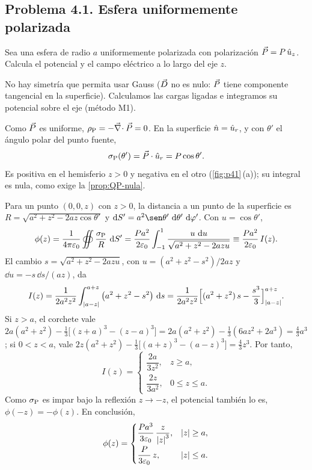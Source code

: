 \subsection{Problema 4.1. Esfera uniformemente polarizada}\label{sec:p41}

\begin{problema}\label{prob:esfera-polarizada}
Sea una esfera de radio $a$ uniformemente polarizada con polarización $\vec P=P\,\hat u_{z}$. Calcula el potencial y el campo eléctrico a lo
largo del eje $z$.
\end{problema}

\begin{resolucion}
\idea No hay simetría que permita usar Gauss ($\vec D$ no es nulo: $\vec P$ tiene componente tangencial en la superficie). Calculamos
las cargas ligadas e integramos su potencial sobre el eje (método M1).

 Como $\vec P$ es uniforme, $\rho_{\mathrm P}=-\vec\nabla\!\cdot\vec P=0$. En la superficie $\hat n=\hat u_{r}$, y con $\theta'$ el ángulo polar del
punto fuente,
\[
  \sigma_{\mathrm P}(\theta')=\vec P\cdot\hat u_{r}=P\cos\theta' .
\]
Es positiva en el hemisferio $z>0$ y negativa en el otro (\cref{fig:p41}\,(a)); su integral es nula, como exige la \cref{prop:QP-nula}.

 Para un punto $(0,0,z)$ con $z>0$, la distancia a un punto de la superficie es
$R=\sqrt{a^2+z^2-2az\cos\theta'}$ y $\dd S'=a^2\sen\theta'\,\dd\theta'\,\dd\varphi'$. Con $u=\cos\theta'$,
\[
  \phi(z)=\frac{1}{4\pi\varepsilon_0}\oiint\frac{\sigma_{\mathrm P}}{R}\,\mathop{}\!\mathrm{d} S'=\frac{Pa^2}{2\varepsilon_0}\int_{-1}^{1}\frac{u\,\mathop{}\!\mathrm{d} u}{\sqrt{a^2+z^2-2azu}}\equiv\frac{Pa^2}{2\varepsilon_0}\,I(z).
\]
El cambio $s=\sqrt{a^2+z^2-2azu}$, con $u=(a^2+z^2-s^2)/2az$ y $\dd u=-s\,\dd s/(az)$, da
\[
  I(z)=\frac{1}{2a^2z^2}\int_{\left\lvert a-z\right\rvert}^{a+z}\big(a^2+z^2-s^2\big)\,\mathop{}\!\mathrm{d} s
      =\frac{1}{2a^2z^2}\Big[(a^2+z^2)\,s-\frac{s^3}{3}\Big]_{\left\lvert a-z\right\rvert}^{a+z}.
\]
Si $z>a$, el corchete vale $2a(a^2+z^2)-\frac13\big[(z+a)^3-(z-a)^3\big]=2a(a^2+z^2)-\frac13(6az^2+2a^3)=\frac43a^3$; si $0<z<a$, vale
$2z(a^2+z^2)-\frac13\big[(a+z)^3-(a-z)^3\big]=\frac43z^3$. Por tanto,
\[
  I(z)=\begin{cases}\dfrac{2a}{3z^2}, & z\geq a,\\[2mm] \dfrac{2z}{3a^2}, & 0\leq z\leq a.\end{cases}
\]
Como $\sigma_{\mathrm P}$ es impar bajo la reflexión $z\to-z$, el potencial también lo es, $\phi(-z)=-\phi(z)$. En conclusión,
\begin{equation}\label{eq:p41-phi}
  \phi(z)=\begin{cases}\dfrac{Pa^3}{3\varepsilon_0}\,\dfrac{z}{\left\lvert z\right\rvert^3}, & \left\lvert z\right\rvert\geq a,\\[3mm] \dfrac{P}{3\varepsilon_0}\,z, & \left\lvert z\right\rvert\leq a.\end{cases}
\end{equation}


\end{resolucion}
